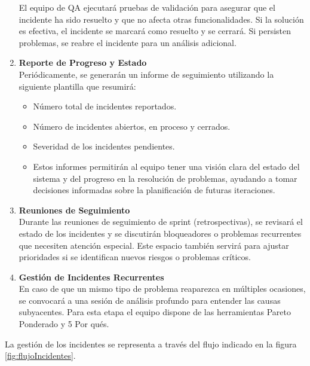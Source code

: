 \begin{enumerate}
    El equipo de QA ejecutará pruebas de validación para asegurar que el incidente ha sido resuelto y que no afecta otras funcionalidades. Si la solución es efectiva,
    el incidente se marcará como resuelto y se cerrará. Si persisten problemas, se reabre el incidente para un análisis adicional.
    \item \textbf{Reporte de Progreso y Estado}\\
    Periódicamente, se generarán un informe de seguimiento utilizando la siguiente plantilla que resumirá:
    \begin{itemize}
        \item Número total de incidentes reportados.
        \item Número de incidentes abiertos, en proceso y cerrados.
        \item Severidad de los incidentes pendientes.
        \item Estos informes permitirán al equipo tener una visión clara del estado del sistema y del progreso en la resolución de problemas, ayudando a tomar decisiones 
        informadas sobre la planificación de futuras iteraciones.
    \end{itemize}
    \item \textbf{Reuniones de Seguimiento}\\
    Durante las reuniones de seguimiento de sprint (retrospectivas), se revisará el estado de los incidentes y se discutirán bloqueadores o problemas recurrentes que
    necesiten atención especial. Este espacio también servirá para ajustar prioridades si se identifican nuevos riesgos o problemas críticos.
    \item \textbf{Gestión de Incidentes Recurrentes}\\
    En caso de que un mismo tipo de problema reaparezca en múltiples ocasiones, se convocará a una sesión de análisis profundo para entender las causas subyacentes.
    Para esta etapa el equipo dispone de las herramientas Pareto Ponderado y 5 Por qués.
\end{enumerate}


La gestión de los incidentes se representa a través del flujo indicado en la figura \ref{fig:flujoIncidentes}.

